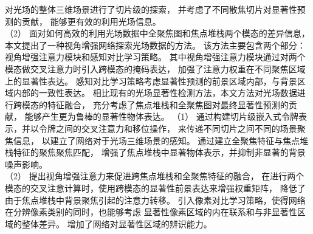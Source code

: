 对光场的整体三维场景进行了切片级的探索，
并考虑了不同散焦切片对显著性预测的贡献，
能够更有效的利用光场信息。
\\
%
%
%
%
\indent
%
%
（2）
%
%
面对如何高效的利用光场数据中全聚焦图和焦点堆栈两个模态的差异信息，
本文提出了一种视角增强网络探索光场数据的方法。
该方法主要包含两个部分：视角增强注意力模块和感知对比学习策略。
其中视角增强注意力模块通过对两个模态做交叉注意力时引入跨模态的掩码表达，
加强了注意力权重在不同聚焦区域上的显著性表达。
感知对比学习策略考虑显著性预测的前景区域内部，与背景区域内部的一致性表达。
相比现有的光场显著性检测方法，本文方法对光场数据进行跨模态的特征融合，
充分考虑了焦点堆栈和全聚焦图对最终显著性预测的贡献，
能够产生更为鲁棒的显著性物体表达。
%
%
%
%
（1）
通过构建切片级嵌入式令牌表示，并以令牌之间的交叉注意力和移位操作，
来传递不同切片之间不同的场景聚焦信息，
以建立了网络对于光场三维场景的感知。
通过建立全聚焦特征与焦点堆栈特征的聚焦聚焦匹配，
增强了焦点堆栈中显著物体表示，并抑制非显著的背景噪声影响。
\\
%
%
%
%
\indent
（2）
提出视角增强注意力来促进跨焦点堆栈和全聚焦特征的融合，
在进行两个模态的交叉注意计算时，使用跨模态的显著性前景表达来增强权重矩阵，
降低了由于焦点堆栈中背景聚焦引起的注意力转移。
引入像素对比学习策略，使得网络在分辨像素类别的同时，也能够考虑
显著性像素区域的内在联系和与非显著性区域的整体差异。
增加了网络对显著性区域的辨识能力。
%
%
%

